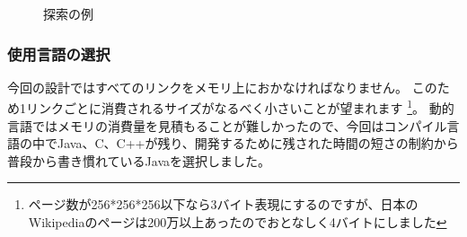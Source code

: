 \begin{figure}
  \centering
  \caption{探索の例}
\end{figure}

\subsubsection{使用言語の選択}
今回の設計ではすべてのリンクをメモリ上におかなければなりません。
このため1リンクごとに消費されるサイズがなるべく小さいことが望まれます
\footnote{ページ数が256*256*256以下なら3バイト表現にするのですが、日本のWikipediaのページは200万以上あったのでおとなしく4バイトにしました}。
動的言語ではメモリの消費量を見積もることが難しかったので、今回はコンパイル言語の中でJava、C、C++が残り、開発するために残された時間の短さの制約から普段から書き慣れているJavaを選択しました。

